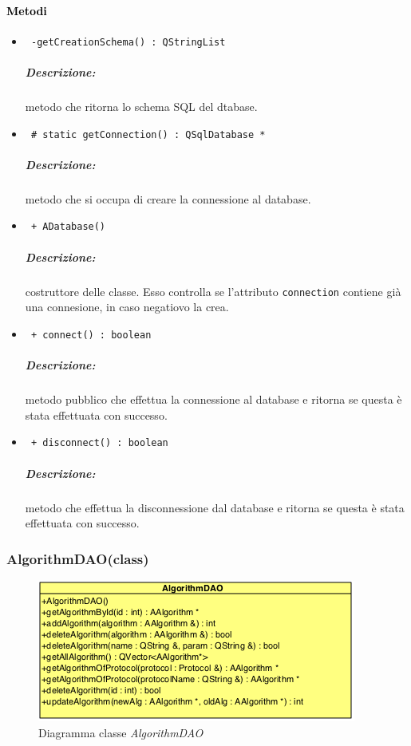 \paragraph{\textcolor{black}{Metodi}}
\begin{itemize}
	\item \color{blue}\verb! -getCreationSchema() : QStringList!\\
	\color{black}
	\subparagraph{Descrizione:} metodo che ritorna lo schema SQL del dtabase.
	
	\item \color{blue}\verb! # static getConnection() : QSqlDatabase *!\\
	\color{black}
	\subparagraph{Descrizione:} metodo che si occupa di creare la connessione al database.
	
	\item \color{blue}\verb! + ADatabase()!\\
	\color{black}
	\subparagraph{Descrizione:} costruttore delle classe. Esso controlla se l'attributo \verb!connection! contiene già una connesione, in caso negatiovo la crea.
	
	\item \color{blue}\verb! + connect() : boolean!\\
	\color{black}
	\subparagraph{Descrizione:} metodo pubblico che effettua la connessione al database e ritorna se questa è stata effettuata con successo.

	\item \color{blue}\verb! + disconnect() : boolean!\\
	\color{black}
	\subparagraph{Descrizione:} metodo che effettua la disconnessione dal database e ritorna se questa è stata effettuata con successo.
	
\end{itemize}

\pagebreak

\subsubsection{AlgorithmDAO(class)}
\label{spealgorithmdao}
\begin{figure}[!h]
\centering
			\includegraphics[scale=1]{./Content/Immagini/model/AlgorithmDAO.png}
			\caption{Diagramma classe \textsl{AlgorithmDAO}}
			\label{cl_algorithmdao}
\end{figure}

